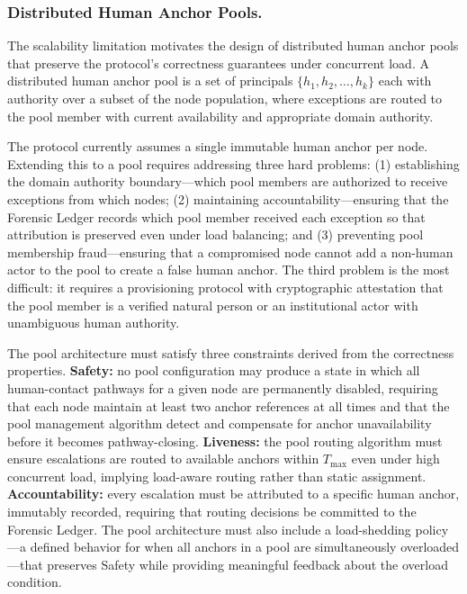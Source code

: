 \subsubsection{Distributed Human Anchor Pools.}
The scalability limitation motivates the design of distributed human anchor pools that preserve the protocol's correctness guarantees under concurrent load. A distributed human anchor pool is a set of principals $\{h_1, h_2, \ldots, h_k\}$ each with authority over a subset of the node population, where exceptions are routed to the pool member with current availability and appropriate domain authority.

The protocol currently assumes a single immutable human anchor per node. Extending this to a pool requires addressing three hard problems: (1) establishing the domain authority boundary---which pool members are authorized to receive exceptions from which nodes; (2) maintaining accountability---ensuring that the Forensic Ledger records which pool member received each exception so that attribution is preserved even under load balancing; and (3) preventing pool membership fraud---ensuring that a compromised node cannot add a non-human actor to the pool to create a false human anchor. The third problem is the most difficult: it requires a provisioning protocol with cryptographic attestation that the pool member is a verified natural person or an institutional actor with unambiguous human authority.

The pool architecture must satisfy three constraints derived from the correctness properties. \textbf{Safety:} no pool configuration may produce a state in which all human-contact pathways for a given node are permanently disabled, requiring that each node maintain at least two anchor references at all times and that the pool management algorithm detect and compensate for anchor unavailability before it becomes pathway-closing. \textbf{Liveness:} the pool routing algorithm must ensure escalations are routed to available anchors within $T_{\max}$ even under high concurrent load, implying load-aware routing rather than static assignment. \textbf{Accountability:} every escalation must be attributed to a specific human anchor, immutably recorded, requiring that routing decisions be committed to the Forensic Ledger. The pool architecture must also include a load-shedding policy---a defined behavior for when all anchors in a pool are simultaneously overloaded---that preserves Safety while providing meaningful feedback about the overload condition.

